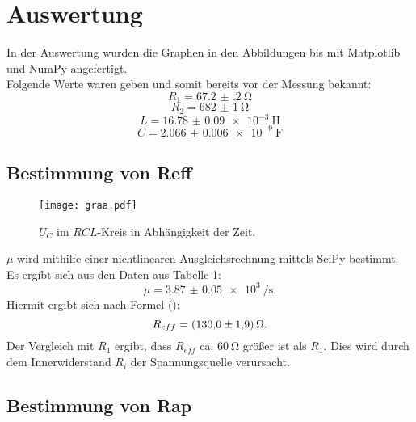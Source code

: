 \section{Auswertung}
\label{sec:Auswertung}
In der Auswertung wurden die Graphen in den Abbildungen  bis  mit Matplotlib \cite{matplotlib} und NumPy \cite{numpy} angefertigt.\\


Folgende Werte waren geben und somit bereits vor der Messung bekannt:
\begin{displaymath}
R_1 = \SI{67.2(2)}{\ohm}
\end{displaymath}
\begin{displaymath}
R_2 = \SI{682(1)}{\ohm}
\end{displaymath}
\begin{displaymath}
L = \SI{16.78(9)e-3}{\henry}
\end{displaymath}
\begin{displaymath}
C = \SI{2.066(6)e-9}{\farad}
\end{displaymath}

\subsection{Bestimmung von Reff}
\begin{figure}[H]
	\centering
	\caption{$U_C$ im $RCL$-Kreis in Abhängigkeit der Zeit.}
	\texttt{[image: graa.pdf]}
	\label{fig:graa}
\end{figure}

$\mu$ wird mithilfe einer nichtlinearen Ausgleichsrechnung mittels SciPy \cite{scipy} bestimmt. Es ergibt sich aus den Daten aus Tabelle 1:
\begin{displaymath}
\mu = \SI{3.87(5)e3}{\per\second}\text{.}
\end{displaymath}
Hiermit ergibt sich nach Formel ():
\begin{displaymath}
R_{eff} = \SI{130 \pm 1.9}{\ohm}\text{.}
\end{displaymath}
Der Vergleich mit $R_1$ ergibt, dass $R_{eff}$ ca. $\SI{60}{\ohm}$ größer ist als $R_1$. Dies wird durch dem Innerwiderstand $R_i$ der Spannungsquelle verursacht.

\subsection{Bestimmung von Rap}

